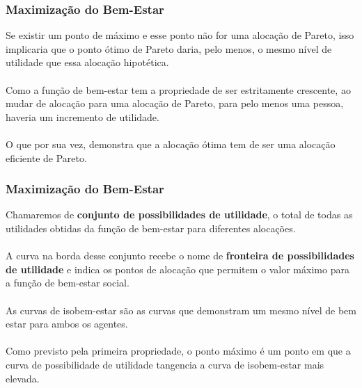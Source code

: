\documentclass{beamer}[10]
\begin{document}
\begin{frame}
	\frametitle{Maximização do Bem-Estar}

	Se existir um ponto de máximo e esse ponto não for uma alocação de Pareto, isso implicaria que o ponto ótimo de Pareto daria, pelo menos, o mesmo nível de utilidade que essa alocação hipotética.
	\\~\\
	Como a função de bem-estar tem a propriedade de ser estritamente crescente, ao mudar de alocação para uma alocação de Pareto, para pelo menos uma pessoa, haveria um incremento de utilidade.
	\\~\\
	O que por sua vez, demonstra que a alocação ótima tem de ser uma alocação eficiente de Pareto.

\end{frame}

\begin{frame}
	\frametitle{Maximização do Bem-Estar}

	Chamaremos de \textbf{conjunto de possibilidades de utilidade}, o total de todas as utilidades obtidas da função de bem-estar para diferentes alocações.
	\\~\\
	A curva na borda desse conjunto recebe o nome de \textbf{fronteira de possibilidades de utilidade} e indica os pontos de alocação que permitem o valor máximo para a função de bem-estar social.
	\\~\\
	As curvas de isobem-estar são as curvas que demonstram um mesmo nível de bem estar para ambos os agentes.
	\\~\\
	Como previsto pela primeira propriedade, o ponto máximo é um ponto em que a curva de possibilidade de utilidade tangencia a curva de isobem-estar mais elevada.

\end{frame}
\end{document}
